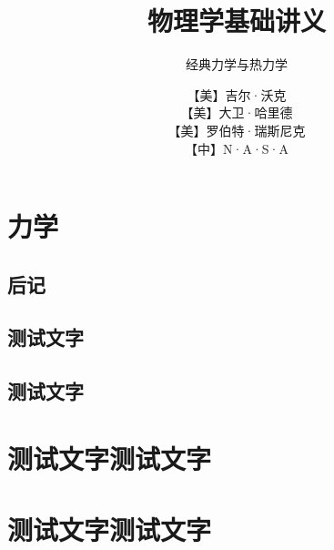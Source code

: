 \documentclass[themecolor=brown]{textbook-cn}%
\title{物理学基础讲义}
\subtitle{经典力学与热力学}
\author{【美】吉尔·沃克\\【美】大卫·哈里德\\【美】罗伯特·瑞斯尼克\\【中】N·A·S·A}
\begin{document}
\MainFont


\maketitle

\lipsum[1-6]



\frontmatter
\lipsum


\shorttableofcontents
\tableofcontents

\listoffigures


\cleardoublepage

\lipsum[2]
%
\mainmatter


\partintro{\lipsum[2]}
\part{力学}
\lipsum


%

%

%
%
%
%
%
%
%
%
%
%
%
%
%


\backmatter

%	

\chapter{后记}

\lipsum




\chapter{测试文字}
\lipsum

\cleardoublepage

\lipsum

\chapter{测试文字}
\lipsum


\partintro{\lipsum[2]}
\part*{测试文字测试文字}


\partsubtitle{ }
\partintro{\lipsum[2]}
\part*{测试文字测试文字}

%
\end{document}
